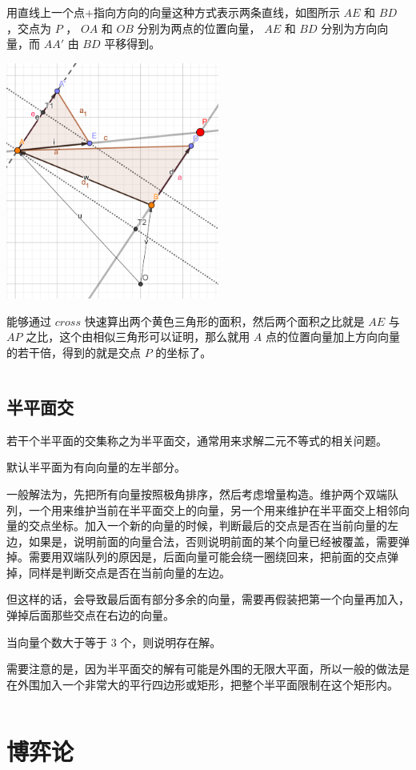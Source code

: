 \documentclass[UTF-8]{ctexart}
\newcommand{\cpp}[1]{\inputminted[bgcolor=bg,breaklines,breakanywhere=true]{c++}{#1}}
\begin{document}
		用直线上一个点+指向方向的向量这种方式表示两条直线，如图所示 $AE$ 和 $BD$ ，交点为 $P$ ， $OA$ 和 $OB$ 分别为两点的位置向量， $AE$ 和 $BD$ 分别为方向向量，而 $AA'$ 由 $BD$ 平移得到。
		\begin{center}
			\includegraphics[width=7cm]{file//point.png}
		\end{center}
		能够通过 $cross$ 快速算出两个黄色三角形的面积，然后两个面积之比就是 $AE$ 与 $AP$ 之比，这个由相似三角形可以证明，那么就用 $A$ 点的位置向量加上方向向量的若干倍，得到的就是交点 $P$ 的坐标了。
		\cpp{code//Geometry//intersection.cpp}
		\subsection{半平面交}
		若干个半平面的交集称之为半平面交，通常用来求解二元不等式的相关问题。  
		
		默认半平面为有向向量的左半部分。
		
		一般解法为，先把所有向量按照极角排序，然后考虑增量构造。维护两个双端队列，一个用来维护当前在半平面交上的向量，另一个用来维护在半平面交上相邻向量的交点坐标。加入一个新的向量的时候，判断最后的交点是否在当前向量的左边，如果是，说明前面的向量合法，否则说明前面的某个向量已经被覆盖，需要弹掉。需要用双端队列的原因是，后面向量可能会绕一圈绕回来，把前面的交点弹掉，同样是判断交点是否在当前向量的左边。  
		
		但这样的话，会导致最后面有部分多余的向量，需要再假装把第一个向量再加入，弹掉后面那些交点在右边的向量。  
		
		当向量个数大于等于 $3$ 个，则说明存在解。
		
		需要注意的是，因为半平面交的解有可能是外围的无限大平面，所以一般的做法是在外围加入一个非常大的平行四边形或矩形，把整个半平面限制在这个矩形内。
		\cpp{code//Geometry//hpi.cpp}
	\newpage
	\section{博弈论}
\end{document}
